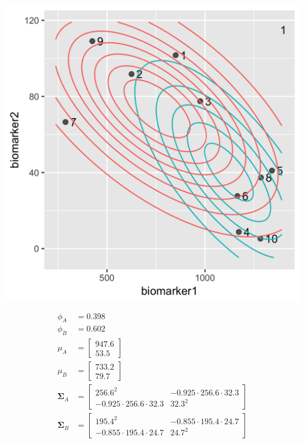 \begin{enumerate}
\begin{minipage}[t]{0.45\textwidth}
\begin{center}
\includegraphics[scale=0.15]{img/biomarker-data-labels-1.png}
\end{center}
\end{minipage}
\qquad
\begin{minipage}[t]{0.45\textwidth}
\small
\begin{align*} 
\phi_A &= 0.398 \\
\phi_B &= 0.602 \\
\mu_A &= \begin{bmatrix} 947.6 \\ 53.5 \end{bmatrix} \\
\mu_B &= \begin{bmatrix} 733.2 \\ 79.7 \end{bmatrix} \\
\boldsymbol\Sigma_A &= \begin{bmatrix} 256.6^2 & -0.925 \cdot 256.6 \cdot 32.3 \\ -0.925 \cdot 256.6 \cdot 32.3 & 32.3^2 \end{bmatrix} \\
\boldsymbol\Sigma_B &= \begin{bmatrix} 195.4^2 & -0.855 \cdot 195.4 \cdot 24.7 \\ -0.855 \cdot 195.4 \cdot 24.7 & 24.7^2\end{bmatrix} 
\end{align*}
\end{minipage}


\end{enumerate}
